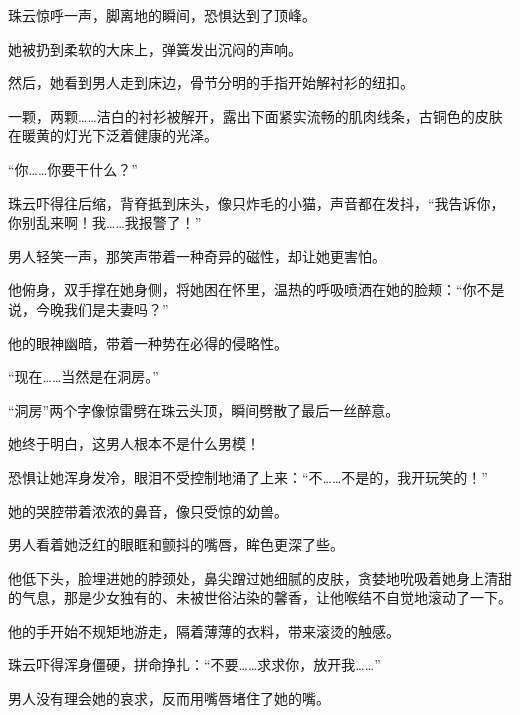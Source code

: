 \documentclass[12pt,a4paper]{article}
\begin{document}
珠云惊呼一声，脚离地的瞬间，恐惧达到了顶峰。



她被扔到柔软的大床上，弹簧发出沉闷的声响。



然后，她看到男人走到床边，骨节分明的手指开始解衬衫的纽扣。



一颗，两颗……洁白的衬衫被解开，露出下面紧实流畅的肌肉线条，古铜色的皮肤在暖黄的灯光下泛着健康的光泽。



“你……你要干什么？”



珠云吓得往后缩，背脊抵到床头，像只炸毛的小猫，声音都在发抖，“我告诉你，你别乱来啊！我……我报警了！”



男人轻笑一声，那笑声带着一种奇异的磁性，却让她更害怕。



他俯身，双手撑在她身侧，将她困在怀里，温热的呼吸喷洒在她的脸颊：“你不是说，今晚我们是夫妻吗？”



他的眼神幽暗，带着一种势在必得的侵略性。



“现在……当然是在洞房。”



“洞房”两个字像惊雷劈在珠云头顶，瞬间劈散了最后一丝醉意。



她终于明白，这男人根本不是什么男模！



恐惧让她浑身发冷，眼泪不受控制地涌了上来：“不……不是的，我开玩笑的！”



她的哭腔带着浓浓的鼻音，像只受惊的幼兽。



男人看着她泛红的眼眶和颤抖的嘴唇，眸色更深了些。



他低下头，脸埋进她的脖颈处，鼻尖蹭过她细腻的皮肤，贪婪地吮吸着她身上清甜的气息，那是少女独有的、未被世俗沾染的馨香，让他喉结不自觉地滚动了一下。



他的手开始不规矩地游走，隔着薄薄的衣料，带来滚烫的触感。



珠云吓得浑身僵硬，拼命挣扎：“不要……求求你，放开我……”



男人没有理会她的哀求，反而用嘴唇堵住了她的嘴。
\end{document}
